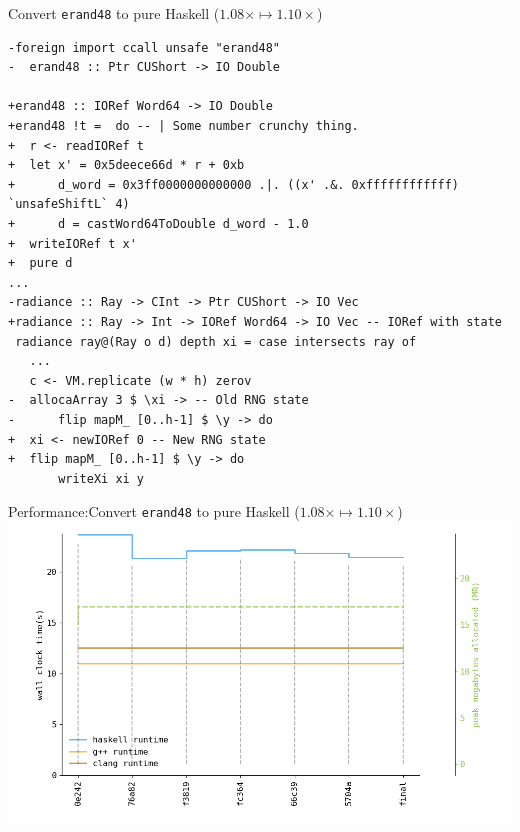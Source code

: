 \documentclass[8pt]{beamer}
\begin{document}
\begin{frame}[fragile]{ Convert \texttt{erand48} to pure Haskell ($1.08\times \mapsto 1.10\times$)}
\begin{verbatim}
-foreign import ccall unsafe "erand48"
-  erand48 :: Ptr CUShort -> IO Double

+erand48 :: IORef Word64 -> IO Double
+erand48 !t =  do -- | Some number crunchy thing.
+  r <- readIORef t
+  let x' = 0x5deece66d * r + 0xb
+      d_word = 0x3ff0000000000000 .|. ((x' .&. 0xffffffffffff) `unsafeShiftL` 4)
+      d = castWord64ToDouble d_word - 1.0
+  writeIORef t x'
+  pure d
...
-radiance :: Ray -> CInt -> Ptr CUShort -> IO Vec
+radiance :: Ray -> Int -> IORef Word64 -> IO Vec -- IORef with state
 radiance ray@(Ray o d) depth xi = case intersects ray of
   ...
   c <- VM.replicate (w * h) zerov
-  allocaArray 3 $ \xi -> -- Old RNG state
-      flip mapM_ [0..h-1] $ \y -> do
+  xi <- newIORef 0 -- New RNG state
+  flip mapM_ [0..h-1] $ \y -> do
       writeXi xi y
\end{verbatim}

\end{frame}

\begin{frame}[fragile]{Performance:Convert \texttt{erand48} to pure Haskell ($1.08\times \mapsto  1.10\times$)}
\includegraphics[height=0.6\textwidth]{perfdata-upto-5704a-gen.png}
\end{frame}
\end{document}

